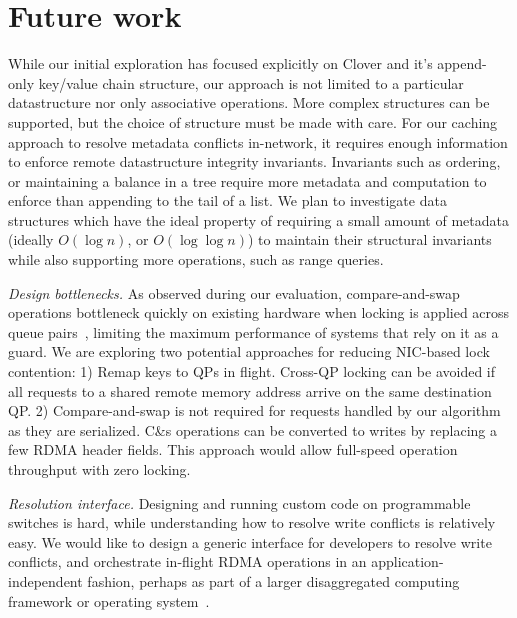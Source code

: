 \section{Future work}

While our initial exploration has focused explicitly on Clover and it's
append-only key/value chain structure, our approach is not limited to
a particular datastructure nor only associative operations. More
complex structures can be supported, but the choice of structure must
be made with care.  For our caching approach to resolve metadata
conflicts in-network, it requires enough information to enforce remote
datastructure integrity invariants. Invariants such as ordering, or
maintaining a balance in a tree require more metadata and computation
to enforce than appending to the tail of a list. We plan to
investigate data structures which have the ideal property of requiring
a small amount of metadata (ideally $O(\log n)$, or $O(\log\log n)$) to
maintain their structural invariants while also supporting more
operations, such as range queries.

\emph{Design bottlenecks.} As observed during our evaluation,
compare-and-swap operations bottleneck quickly on existing hardware
when locking is applied across queue pairs~\cite{design-guidelines},
limiting the maximum performance of systems that rely on it as a
guard.  We are exploring two potential approaches for reducing
NIC-based lock contention: 1) Remap keys to QPs in flight. Cross-QP
locking can be avoided if all requests to a shared remote memory
address arrive on the same destination QP. 2) Compare-and-swap is not
required for requests handled by our algorithm as they are
serialized. C\&s operations can be converted to writes by replacing a
few RDMA header fields. This approach would allow full-speed operation
throughput with zero locking.


\emph{Resolution interface.}
Designing and running custom code on programmable switches is hard,
while understanding how to resolve write conflicts is relatively
easy. We would like to design a generic interface for developers to
resolve write conflicts, and orchestrate in-flight RDMA operations in
an application-independent fashion, perhaps as part of a larger
disaggregated computing framework or operating system~\cite{legoos}.
